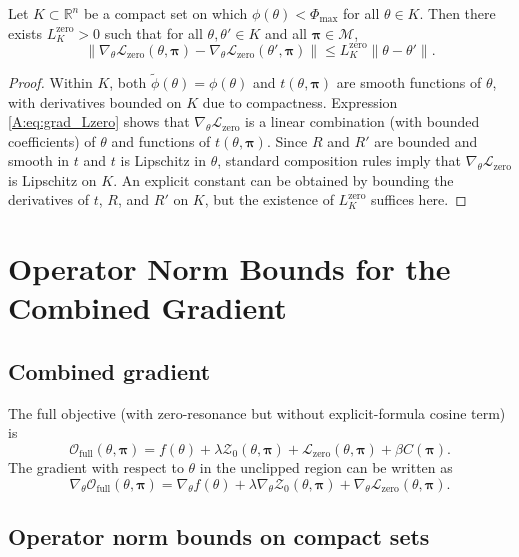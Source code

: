 \documentclass[11pt]{article}
\begin{document}
\begin{lemma}
Let $K\subset\mathbb{R}^n$ be a compact set on which $\phi(\theta)<\Phi_{\max}$ for all $\theta\in K$. Then there exists $L^{\mathrm{zero}}_K>0$ such that for all $\theta,\theta'\in K$ and all $\bm{\pi}\in\mathcal{M}$,
\[
  \|\nabla_\theta\mathcal{L}_{\mathrm{zero}}(\theta,\bm{\pi}) -
    \nabla_\theta\mathcal{L}_{\mathrm{zero}}(\theta',\bm{\pi})\|
  \le L^{\mathrm{zero}}_K \|\theta-\theta'\|.
\]
\end{lemma}

\begin{proof}
Within $K$, both $\tilde{\phi}(\theta)=\phi(\theta)$ and $t(\theta,\bm{\pi})$ are smooth functions of $\theta$, with derivatives bounded on $K$ due to compactness. Expression \eqref{A:eq:grad_Lzero} shows that $\nabla_\theta\mathcal{L}_{\mathrm{zero}}$ is a linear combination (with bounded coefficients) of $\theta$ and functions of $t(\theta,\bm{\pi})$. Since $R$ and $R'$ are bounded and smooth in $t$ and $t$ is Lipschitz in $\theta$, standard composition rules imply that $\nabla_\theta\mathcal{L}_{\mathrm{zero}}$ is Lipschitz on $K$. An explicit constant can be obtained by bounding the derivatives of $t$, $R$, and $R'$ on $K$, but the existence of $L^{\mathrm{zero}}_K$ suffices here.
\end{proof}

\section{Operator Norm Bounds for the Combined Gradient}

\subsection{Combined gradient}

The full objective (with zero-resonance but without explicit-formula cosine term) is
\[
  \mathcal{O}_{\mathrm{full}}(\theta,\bm{\pi})
   = f(\theta) + \lambda \mathcal{Z}_0(\theta,\bm{\pi})
     + \mathcal{L}_{\mathrm{zero}}(\theta,\bm{\pi})
     + \beta C(\bm{\pi}).
\]
The gradient with respect to $\theta$ in the unclipped region can be written as
\[
  \nabla_\theta\mathcal{O}_{\mathrm{full}}(\theta,\bm{\pi})
   = \nabla_\theta f(\theta)
     + \lambda \nabla_\theta \mathcal{Z}_0(\theta,\bm{\pi})
     + \nabla_\theta \mathcal{L}_{\mathrm{zero}}(\theta,\bm{\pi}).
\]

\subsection{Operator norm bounds on compact sets}
\end{document}
